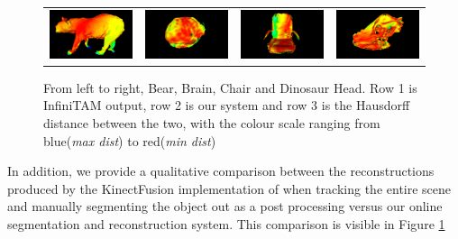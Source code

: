 \begin{figure}[!t]
\begin{tabular}{cccc}
		\includegraphics[width=3cm]{hausdorff/bear.png}&
		\includegraphics[width=3cm]{hausdorff/brain.png}&
		\includegraphics[width=3cm]{hausdorff/chair.png}&
		\includegraphics[width=3cm]{hausdorff/dino.png}\\
	\end{tabular}
	\vspace{-3mm}
	\caption{
		From left to right, Bear, Brain, Chair and Dinosaur Head. Row 1 is InfiniTAM output, row 2 is our system and row 3 is the Hausdorff distance between the two, with the colour scale ranging from blue(\textit{max dist}) to red(\textit{min dist})
	}
	\vspace{-5mm}
	\label{fig:demo}
\end{figure}

In addition, we provide a qualitative comparison between the reconstructions produced by the KinectFusion implementation of \cite{Prisacariu2014} when 
tracking the entire scene and manually segmenting the object out as a post processing versus our online segmentation and reconstruction system. This 
comparison is visible in Figure \ref{fig:demo}

